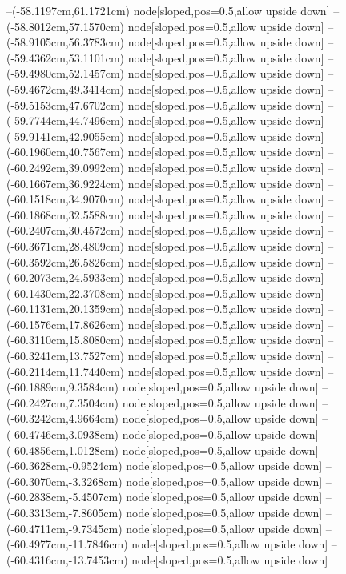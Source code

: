 --(-58.1197cm,61.1721cm) node[sloped,pos=0.5,allow upside down]{\arrowIn}
--(-58.8012cm,57.1570cm) node[sloped,pos=0.5,allow upside down]{\ArrowIn}
--(-58.9105cm,56.3783cm) node[sloped,pos=0.5,allow upside down]{\arrowIn}
--(-59.4362cm,53.1101cm) node[sloped,pos=0.5,allow upside down]{\ArrowIn}
--(-59.4980cm,52.1457cm) node[sloped,pos=0.5,allow upside down]{\arrowIn}
--(-59.4672cm,49.3414cm) node[sloped,pos=0.5,allow upside down]{\ArrowIn}
--(-59.5153cm,47.6702cm) node[sloped,pos=0.5,allow upside down]{\ArrowIn}
--(-59.7744cm,44.7496cm) node[sloped,pos=0.5,allow upside down]{\ArrowIn}
--(-59.9141cm,42.9055cm) node[sloped,pos=0.5,allow upside down]{\ArrowIn}
--(-60.1960cm,40.7567cm) node[sloped,pos=0.5,allow upside down]{\ArrowIn}
--(-60.2492cm,39.0992cm) node[sloped,pos=0.5,allow upside down]{\ArrowIn}
--(-60.1667cm,36.9224cm) node[sloped,pos=0.5,allow upside down]{\ArrowIn}
--(-60.1518cm,34.9070cm) node[sloped,pos=0.5,allow upside down]{\ArrowIn}
--(-60.1868cm,32.5588cm) node[sloped,pos=0.5,allow upside down]{\ArrowIn}
--(-60.2407cm,30.4572cm) node[sloped,pos=0.5,allow upside down]{\ArrowIn}
--(-60.3671cm,28.4809cm) node[sloped,pos=0.5,allow upside down]{\ArrowIn}
--(-60.3592cm,26.5826cm) node[sloped,pos=0.5,allow upside down]{\ArrowIn}
--(-60.2073cm,24.5933cm) node[sloped,pos=0.5,allow upside down]{\ArrowIn}
--(-60.1430cm,22.3708cm) node[sloped,pos=0.5,allow upside down]{\ArrowIn}
--(-60.1131cm,20.1359cm) node[sloped,pos=0.5,allow upside down]{\ArrowIn}
--(-60.1576cm,17.8626cm) node[sloped,pos=0.5,allow upside down]{\ArrowIn}
--(-60.3110cm,15.8080cm) node[sloped,pos=0.5,allow upside down]{\ArrowIn}
--(-60.3241cm,13.7527cm) node[sloped,pos=0.5,allow upside down]{\ArrowIn}
--(-60.2114cm,11.7440cm) node[sloped,pos=0.5,allow upside down]{\ArrowIn}
--(-60.1889cm,9.3584cm) node[sloped,pos=0.5,allow upside down]{\ArrowIn}
--(-60.2427cm,7.3504cm) node[sloped,pos=0.5,allow upside down]{\ArrowIn}
--(-60.3242cm,4.9664cm) node[sloped,pos=0.5,allow upside down]{\ArrowIn}
--(-60.4746cm,3.0938cm) node[sloped,pos=0.5,allow upside down]{\ArrowIn}
--(-60.4856cm,1.0128cm) node[sloped,pos=0.5,allow upside down]{\ArrowIn}
--(-60.3628cm,-0.9524cm) node[sloped,pos=0.5,allow upside down]{\ArrowIn}
--(-60.3070cm,-3.3268cm) node[sloped,pos=0.5,allow upside down]{\ArrowIn}
--(-60.2838cm,-5.4507cm) node[sloped,pos=0.5,allow upside down]{\ArrowIn}
--(-60.3313cm,-7.8605cm) node[sloped,pos=0.5,allow upside down]{\ArrowIn}
--(-60.4711cm,-9.7345cm) node[sloped,pos=0.5,allow upside down]{\ArrowIn}
--(-60.4977cm,-11.7846cm) node[sloped,pos=0.5,allow upside down]{\ArrowIn}
--(-60.4316cm,-13.7453cm) node[sloped,pos=0.5,allow upside down]{\ArrowIn}
